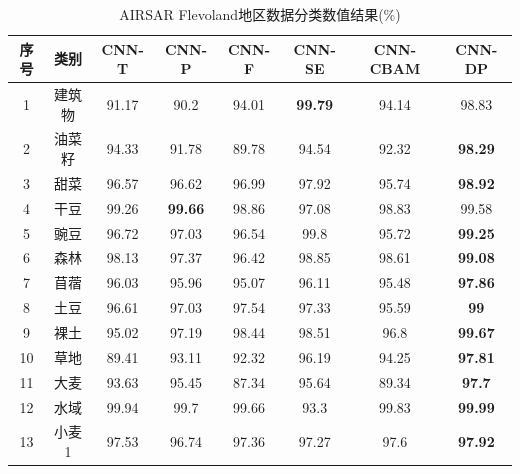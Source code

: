 \begin{table}[ht!]
    \caption{AIRSAR Flevoland地区数据分类数值结果(\%)}
    \label{tab:fle_result}
    \renewcommand\arraystretch{1.0}
    \begin{tabular}{cccccccc}
        \toprule[1.5bp]
        序号                        & 类别    & CNN-T & CNN-P          & CNN-F & CNN-SE         & CNN-CBAM       & CNN-DP         \\
        \midrule[0.75bp]
        1                         & 建筑物   & 91.17 & 90.2           & 94.01 & \textbf{99.79} & 94.14          & 98.83          \\
        2                         & 油菜籽   & 94.33 & 91.78          & 89.78 & 94.54          & 92.32          & \textbf{98.29} \\
        3                         & 甜菜    & 96.57 & 96.62          & 96.99 & 97.92          & 95.74          & \textbf{98.92} \\
        4                         & 干豆    & 99.26 & \textbf{99.66} & 98.86 & 97.08          & 98.83          & 99.58          \\
        5                         & 豌豆    & 96.72 & 97.03          & 96.54 & 99.8           & 95.72          & \textbf{99.25} \\
        6                         & 森林    & 98.13 & 97.37          & 96.42 & 98.85          & 98.61          & \textbf{99.08} \\
        7                         & 苜蓿    & 96.03 & 95.96          & 95.07 & 96.11          & 95.48          & \textbf{97.86} \\
        8                         & 土豆    & 96.61 & 97.03          & 97.54 & 97.33          & 95.59          & \textbf{99}    \\
        9                         & 裸土    & 95.02 & 97.19          & 98.44 & 98.51          & 96.8           & \textbf{99.67} \\
        10                        & 草地    & 89.41 & 93.11          & 92.32 & 96.19          & 94.25          & \textbf{97.81} \\
        11                        & 大麦    & 93.63 & 95.45          & 87.34 & 95.64          & 89.34          & \textbf{97.7}  \\
        12                        & 水域    & 99.94 & 99.7           & 99.66 & 93.3           & 99.83          & \textbf{99.99} \\
        13                        & 小麦 1  & 97.53 & 96.74          & 97.36 & 97.27          & 97.6           & \textbf{97.92} \\

\end{tabular}
\end{table}
